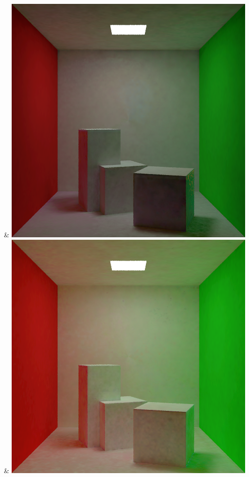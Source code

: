 & \includegraphics[width=\linewidth]{figures/py/tests/quality_comparison/nrc+pt_1spp_diffuse.png}
& \includegraphics[width=\linewidth]{figures/py/tests/quality_comparison/nrc+pt+sl_1spp_diffuse.png}
